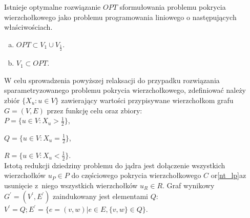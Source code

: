\begin{theorem}
  Istnieje optymalne rozwiązanie $OPT$ sformułowania problemu pokrycia wierzchołkowego jako problemu programowania liniowego o następujących właściwościach.
  \begin{enumerate}[(a)]
    \item $OPT \subset V_1 \cup V_{\frac{1}{2}}$.
    \item $V_1 \subset OPT$.
  \end{enumerate}
\end{theorem}
W celu sprowadzenia powyższej relaksacji do przypadku rozwiązania
sparametryzowanego problemu pokrycia wierzchołkowego, zdefiniować należy zbiór 
$\{ X_u : u \in V \}$ zawierający wartości przypisywane wierzchołkom grafu 
$G=(V,E)$ przez funkcję celu oraz zbiory:\\


$P=\{u \in V : X_u>\frac{1}{2}\}$,\par
$Q=\{u \in V : X_u=\frac{1}{2}\}$,\par
$R=\{u \in V : X_u<\frac{1}{2}\}$.\\


Istotą redukcji dziedziny problemu do jądra jest dołączenie wszystkich
wierzchołków $u_P \in P$ do częściowego pokrycia wierzchołkowego $C$ or\ref{nt_lp}az 
usunięcie z~niego wszystkich wierzchołków $u_R \in R$.
Graf wynikowy $G^\prime=(V^\prime, E^\prime)$ zaindukowany jest elementami $Q$: 
$V^\prime=Q; E^\prime=\{e=(v, w)| e \in E, \{v, w\} \in Q\}$.

